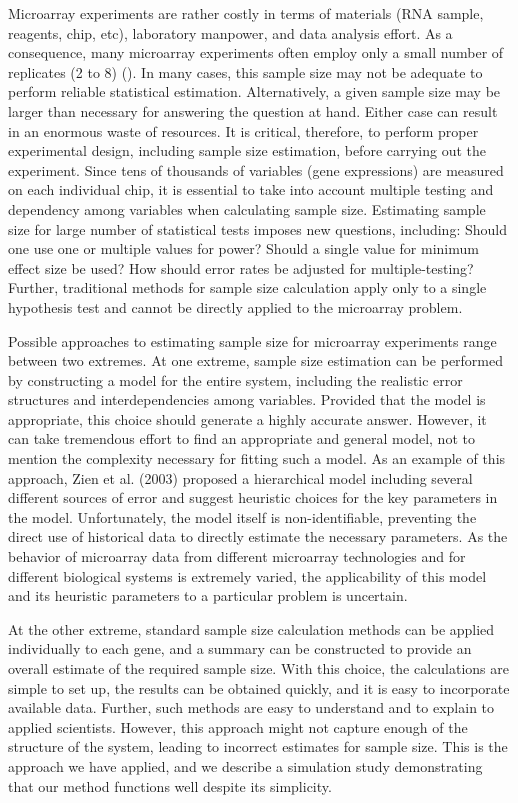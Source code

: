 \documentclass{bioinfo}
\begin{document}
Microarray experiments are rather costly in terms of materials
(RNA sample, reagents, chip, etc), laboratory manpower, and data
analysis effort.  As a consequence, many microarray experiments
often employ only a small number of replicates (2 to 8)
(\citealp{Speed03}). In many cases, this sample size may not be
adequate to perform reliable statistical estimation.
Alternatively, a given sample size may be larger than necessary
for answering the question at hand.  Either case can result in an
enormous waste of resources. It is critical, therefore, to perform
proper experimental design, including sample size estimation,
before carrying out the experiment. Since tens of thousands of
variables (gene expressions) are measured on each individual chip,
it is essential to take into account multiple testing and
dependency among variables when calculating sample size.
Estimating sample size for large number of statistical tests
imposes new questions, including: Should one use one or multiple
values for power? Should a single value for minimum effect size be
used?  How should error rates be adjusted for multiple-testing?
Further, traditional methods for sample size calculation apply
only to a single hypothesis test and cannot be directly applied to
the microarray problem.

Possible approaches to estimating sample size for microarray
experiments range between two extremes. At one extreme, sample size
estimation can be performed by constructing a model for the entire
system, including the realistic error structures and
interdependencies among variables. Provided that the model is
appropriate, this choice should generate a highly accurate answer.
However, it can take tremendous effort to find an appropriate and
general model, not to mention the complexity necessary for fitting
such a model. As an example of this approach, Zien et al. (2003)
proposed a hierarchical model including several different sources of
error and suggest heuristic choices for the key parameters in the
model. Unfortunately, the model itself is non-identifiable,
preventing the direct use of historical data to directly estimate
the necessary parameters.  As the behavior of microarray data from
different microarray technologies and for different biological
systems is extremely varied, the applicability of this model and its
heuristic parameters to a particular problem is uncertain.

At the other extreme, standard sample size calculation methods can
be applied individually to each gene, and a summary can be
constructed to provide an overall estimate of the required sample
size.  With this choice, the calculations are simple to set up,
the results can be obtained quickly, and it is easy to incorporate
available data. Further, such methods are easy to understand and
to explain to applied scientists.  However, this approach might
not capture enough of the structure of the system, leading to
incorrect estimates for sample size.  This is the approach we have
applied, and we describe a simulation study demonstrating that our
method functions well despite its simplicity.
\end{document}

